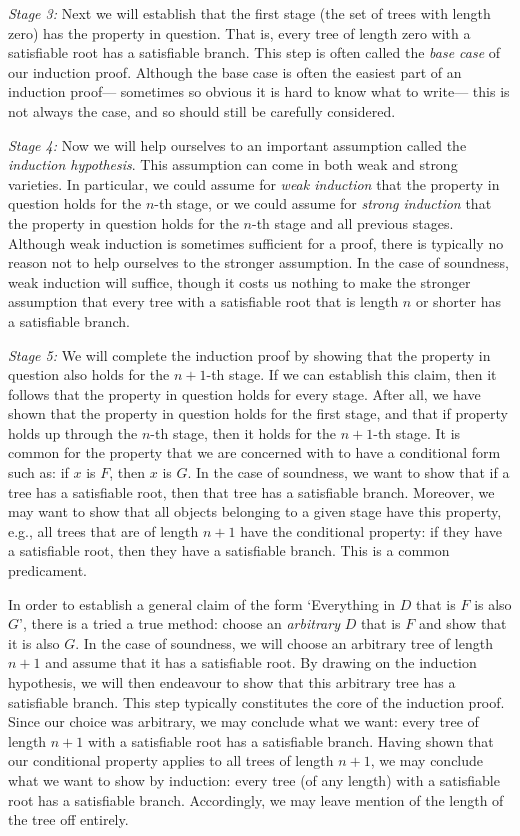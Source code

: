 \textit{Stage 3:} 
Next we will establish that the first stage (the set of trees with length zero) has the property in question.
That is, every tree of length zero with a satisfiable root has a satisfiable branch.
This step is often called the \textit{base case} of our induction proof.
Although the base case is often the easiest part of an induction proof--- sometimes so obvious it is hard to know what to write--- this is not always the case, and so should still be carefully considered.

\textit{Stage 4:} 
Now we will help ourselves to an important assumption called the \textit{induction hypothesis}.
This assumption can come in both weak and strong varieties.
In particular, we could assume for \textit{weak induction} that the property in question holds for the $n$-th stage, or we could assume for \textit{strong induction} that the property in question holds for the $n$-th stage and all previous stages.
Although weak induction is sometimes sufficient for a proof, there is typically no reason not to help ourselves to the stronger assumption.
In the case of soundness, weak induction will suffice, though it costs us nothing to make the stronger assumption that every tree with a satisfiable root that is length $n$ or shorter has a satisfiable branch. 

\textit{Stage 5:} 
We will complete the induction proof by showing that the property in question also holds for the $n+1$-th stage.
If we can establish this claim, then it follows that the property in question holds for every stage.
After all, we have shown that the property in question holds for the first stage, and that if property holds up through the $n$-th stage, then it holds for the $n+1$-th stage.
It is common for the property that we are concerned with to have a conditional form such as: if $x$ is $F$, then $x$ is $G$.
In the case of soundness, we want to show that if a tree has a satisfiable root, then that tree has a satisfiable branch.
Moreover, we may want to show that all objects belonging to a given stage have this property, e.g., all trees that are of length $n+1$ have the conditional property: if they have a satisfiable root, then they have a satisfiable branch. 
This is a common predicament.

In order to establish a general claim of the form `Everything in $D$ that is $F$ is also $G$', there is a tried a true method: choose an \textit{arbitrary} $D$ that is $F$ and show that it is also $G$.
In the case of soundness, we will choose an arbitrary tree of length $n+1$ and assume that it has a satisfiable root.
By drawing on the induction hypothesis, we will then endeavour to show that this arbitrary tree has a satisfiable branch. 
This step typically constitutes the core of the induction proof.
Since our choice was arbitrary, we may conclude what we want: every tree of length $n+1$ with a satisfiable root has a satisfiable branch. 
Having shown that our conditional property applies to all trees of length $n+1$, we may conclude what we want to show by induction: every tree (of any length) with a satisfiable root has a satisfiable branch.
Accordingly, we may leave mention of the length of the tree off entirely.

